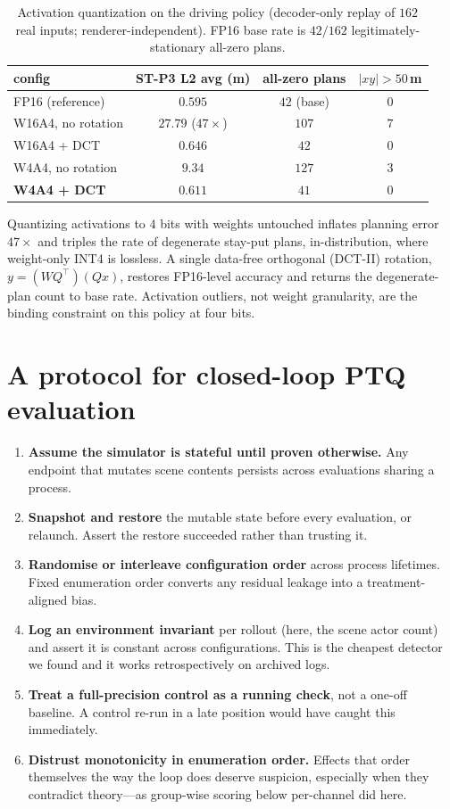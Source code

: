 \documentclass[conference]{IEEEtran}
\begin{document}
\begin{table}[t]\centering
\caption{Activation quantization on the driving policy (decoder-only replay of $162$ real inputs;
renderer-independent). FP16 base rate is $42/162$ legitimately-stationary all-zero plans.}
\label{tab:act}
\begin{tabular}{lccc}
\toprule
config & ST-P3 L2 avg (m) & all-zero plans & $|xy|>50$\,m \\
\midrule
FP16 (reference) & $0.595$ & $42$ (base) & $0$ \\
W16A4, no rotation & $\mathbf{27.79}$ ($47\times$) & $107$ & $7$ \\
W16A4 + DCT & $0.646$ & $42$ & $0$ \\
W4A4, no rotation & $9.34$ & $127$ & $3$ \\
\textbf{W4A4 + DCT} & $\mathbf{0.611}$ & $41$ & $0$ \\
\bottomrule
\end{tabular}
\end{table}

Quantizing activations to $4$ bits with weights untouched inflates planning error $47\times$ and
triples the rate of degenerate stay-put plans, in-distribution, where weight-only INT4 is
lossless. A single data-free orthogonal (DCT-II) rotation, $y=(WQ^\top)(Qx)$, restores FP16-level
accuracy and returns the degenerate-plan count to base rate. Activation outliers, not weight
granularity, are the binding constraint on this policy at four bits.

\section{A protocol for closed-loop PTQ evaluation}
\begin{enumerate}
\item \textbf{Assume the simulator is stateful until proven otherwise.} Any endpoint that mutates
scene contents persists across evaluations sharing a process.
\item \textbf{Snapshot and restore} the mutable state before every evaluation, or relaunch. Assert
the restore succeeded rather than trusting it.
\item \textbf{Randomise or interleave configuration order} across process lifetimes. Fixed
enumeration order converts any residual leakage into a treatment-aligned bias.
\item \textbf{Log an environment invariant} per rollout (here, the scene actor count) and assert
it is constant across configurations. This is the cheapest detector we found and it works
retrospectively on archived logs.
\item \textbf{Treat a full-precision control as a running check}, not a one-off baseline. A
control re-run in a late position would have caught this immediately.
\item \textbf{Distrust monotonicity in enumeration order.} Effects that order themselves the way
the loop does deserve suspicion, especially when they contradict theory---as group-wise scoring
below per-channel did here.
\end{enumerate}
\end{document}
